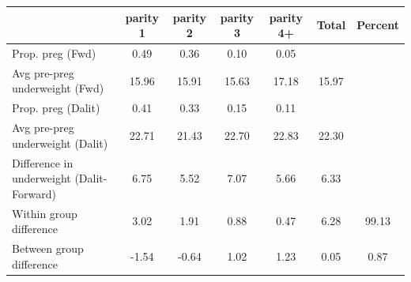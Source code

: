 \begin{tabular}{l*{6}{c}}
\toprule
            &\multicolumn{1}{c}{parity 1}&\multicolumn{1}{c}{parity 2}&\multicolumn{1}{c}{parity 3}&\multicolumn{1}{c}{parity 4+}&\multicolumn{1}{c}{Total}&\multicolumn{1}{c}{Percent}\\
\midrule
\midrule
Prop. preg (Fwd)&        0.49&        0.36&        0.10&        0.05&            &            \\
Avg pre-preg underweight (Fwd)&       15.96&       15.91&       15.63&       17.18&       15.97&            \\
Prop. preg (Dalit)&        0.41&        0.33&        0.15&        0.11&            &            \\
Avg pre-preg underweight (Dalit)&       22.71&       21.43&       22.70&       22.83&       22.30&            \\
Difference in underweight (Dalit-Forward)&        6.75&        5.52&        7.07&        5.66&        6.33&            \\
Within group difference&        3.02&        1.91&        0.88&        0.47&        6.28&       99.13\\
Between group difference&       -1.54&       -0.64&        1.02&        1.23&        0.05&        0.87\\
\bottomrule
\end{tabular}
